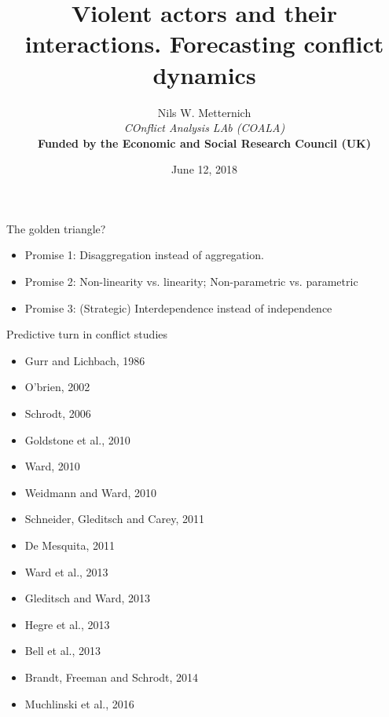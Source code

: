 \documentclass{beamer}
\begin{document}
\title[UCL]
{
Violent actors and their interactions. Forecasting conflict dynamics}
\author[GCRI]
{
Nils W. Metternich \\[3ex]
\footnotesize{\emph{COnflict Analysis LAb (COALA)}}\\
\textbf{Funded by the Economic and Social Research Council (UK)}}

\date{June 12, 2018}

\begin{frame}
\titlepage
\end{frame}

\begin{frame}{The golden triangle?}
\begin{itemize}
\item Promise 1: Disaggregation instead of aggregation. 
\item Promise 2: Non-linearity vs. linearity; Non-parametric vs. parametric
\item Promise 3: (Strategic) Interdependence instead of independence  
\end{itemize}
\end{frame}


\begin{frame}{Predictive turn in conflict studies}
\begin{minipage}{2.1in}
\begin{tiny}
\begin{itemize}
\item Gurr and Lichbach, 1986
\item O'brien, 2002
\item Schrodt, 2006
\item Goldstone et al., 2010
\item Ward, 2010
\item Weidmann and Ward, 2010
\item Schneider, Gleditsch and Carey, 2011
\end{itemize}
 \end{tiny}
\end{minipage}
\begin{minipage}{2.5in}
\begin{tiny}
\begin{itemize}
\item De Mesquita, 2011
\item Ward et al., 2013
\item Gleditsch and Ward, 2013
\item Hegre et al., 2013
\item Bell et al., 2013
\item Brandt, Freeman and Schrodt, 2014
\item Muchlinski et al., 2016
\end{itemize}
 \end{tiny}
\end{minipage}
\end{frame}
\end{document}
